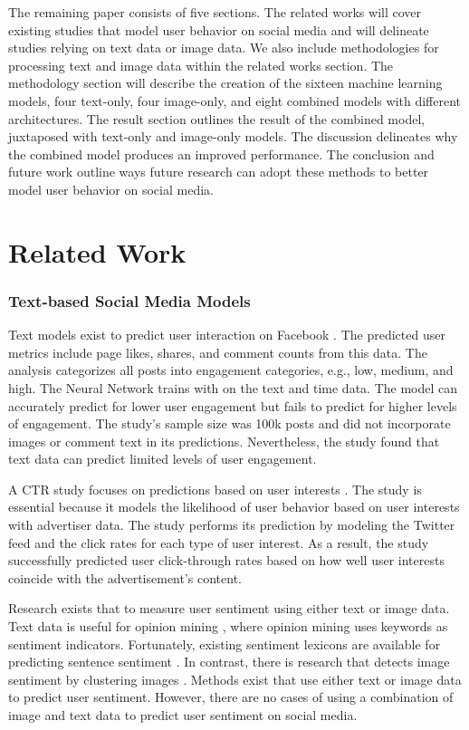 \documentclass[mksc,blindrev]{informs3} %
\begin{document}
The remaining paper consists of five sections. The related works will cover existing studies that model user behavior on social media and will delineate studies relying on text data or image data. We also include methodologies for processing text and image data within the related works section. The methodology section will describe the creation of the sixteen machine learning models, four text-only, four image-only, and eight combined models with different architectures. The result section outlines the result of the combined model, juxtaposed with text-only and image-only models. The discussion delineates why the combined model produces an improved performance. The conclusion and future work outline ways future research can adopt these methods to better model user behavior on social media.

\section{Related Work}

\subsubsection{Text-based Social Media Models}
Text models exist to predict user interaction on Facebook \cite{8029313}. The predicted user metrics include page likes, shares, and comment counts from this data. The analysis categorizes all posts into engagement categories, e.g., low, medium, and high.  The Neural Network trains with on the text and time data. The model can accurately predict for lower user engagement but fails to predict for higher levels of engagement. The study's sample size was 100k posts and did not incorporate images or comment text in its predictions. Nevertheless, the study found that text data can predict limited levels of user engagement.

A CTR study focuses on predictions based on user interests \cite{Li2015}. The study is essential because it models the likelihood of user behavior based on user interests with advertiser data.  The study performs its prediction by modeling the Twitter feed and the click rates for each type of user interest. As a result, the study successfully predicted user click-through rates based on how well user interests coincide with the advertisement's content.

Research exists that to measure user sentiment using either text or image data. Text data is useful for opinion mining \cite{Liu2012}, where opinion mining uses keywords as sentiment indicators. Fortunately, existing sentiment lexicons are available for predicting sentence sentiment \cite{Georgiou2015}. In contrast, there is research that detects image sentiment by clustering images \cite{Wang2015}. Methods exist that use either text or image data to predict user sentiment. However, there are no cases of using a combination of image and text data to predict user sentiment on social media.
\end{document}
